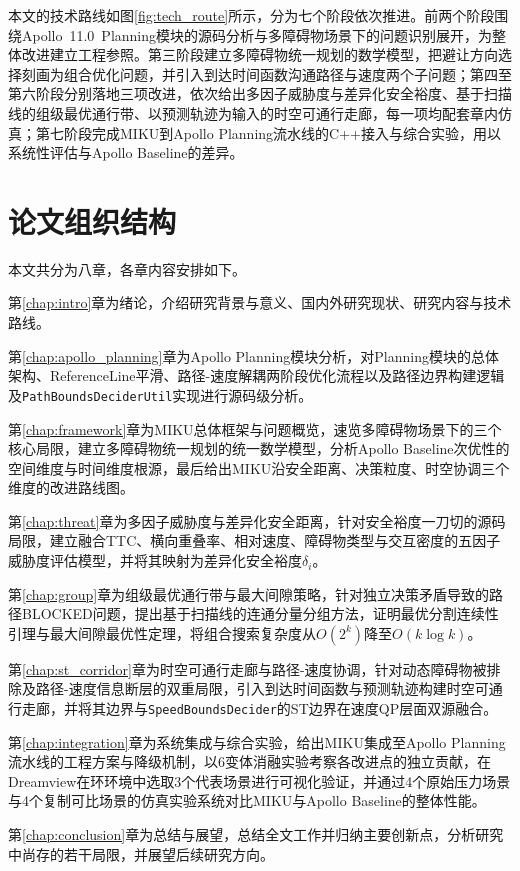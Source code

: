 本文的技术路线如图\ref{fig:tech_route}所示，分为七个阶段依次推进。前两个阶段围绕Apollo~11.0~Planning模块的源码分析与多障碍物场景下的问题识别展开，为整体改进建立工程参照。第三阶段建立多障碍物统一规划的数学模型，把避让方向选择刻画为组合优化问题，并引入到达时间函数沟通路径与速度两个子问题；第四至第六阶段分别落地三项改进，依次给出多因子威胁度与差异化安全裕度、基于扫描线的组级最优通行带、以预测轨迹为输入的时空可通行走廊，每一项均配套章内仿真；第七阶段完成MIKU到Apollo Planning流水线的C++接入与综合实验，用以系统性评估与Apollo Baseline的差异。


\section{论文组织结构}

本文共分为八章，各章内容安排如下。

第\ref{chap:intro}章为绪论，介绍研究背景与意义、国内外研究现状、研究内容与技术路线。

第\ref{chap:apollo_planning}章为Apollo Planning模块分析，对Planning模块的总体架构、ReferenceLine平滑、路径-速度解耦两阶段优化流程以及路径边界构建逻辑及\texttt{PathBoundsDeciderUtil}实现进行源码级分析。

第\ref{chap:framework}章为MIKU总体框架与问题概览，速览多障碍物场景下的三个核心局限，建立多障碍物统一规划的统一数学模型，分析Apollo Baseline次优性的空间维度与时间维度根源，最后给出MIKU沿安全距离、决策粒度、时空协调三个维度的改进路线图。

第\ref{chap:threat}章为多因子威胁度与差异化安全距离，针对安全裕度一刀切的源码局限，建立融合TTC、横向重叠率、相对速度、障碍物类型与交互密度的五因子威胁度评估模型，并将其映射为差异化安全裕度$\delta_i$。

第\ref{chap:group}章为组级最优通行带与最大间隙策略，针对独立决策矛盾导致的路径BLOCKED问题，提出基于扫描线的连通分量分组方法，证明最优分割连续性引理与最大间隙最优性定理，将组合搜索复杂度从$O(2^k)$降至$O(k\log k)$。

第\ref{chap:st_corridor}章为时空可通行走廊与路径-速度协调，针对动态障碍物被排除及路径-速度信息断层的双重局限，引入到达时间函数与预测轨迹构建时空可通行走廊，并将其边界与\texttt{SpeedBoundsDecider}的ST边界在速度QP层面双源融合。

第\ref{chap:integration}章为系统集成与综合实验，给出MIKU集成至Apollo Planning流水线的工程方案与降级机制，以6变体消融实验考察各改进点的独立贡献，在Dreamview在环环境中选取3个代表场景进行可视化验证，并通过4个原始压力场景与4个复制可比场景的仿真实验系统对比MIKU与Apollo Baseline的整体性能。

第\ref{chap:conclusion}章为总结与展望，总结全文工作并归纳主要创新点，分析研究中尚存的若干局限，并展望后续研究方向。
